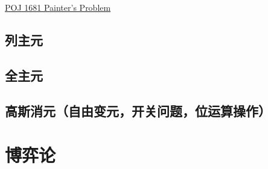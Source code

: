\begin{example}[高斯消元]
\href{http://poj.org/problem?id=1681}{POJ 1681 Painter’s Problem}
\end{example}


\subsection{列主元}


\subsection{全主元}


\subsection{高斯消元（自由变元，开关问题，位运算操作）}


\section{博弈论}



\endinput %
